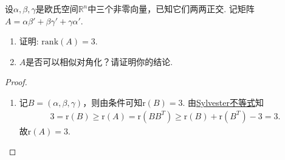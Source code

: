 \documentclass[../../main.tex]{subfiles}%
\begin{document}
\begin{example}
设$\alpha,\beta,\gamma$是欧氏空间$\mathbb{R}^n$中三个非零向量，已知它们两两正交. 记矩阵$A = \alpha\beta' + \beta\gamma' + \gamma\alpha'$.
\begin{enumerate}[(1)]
\item 证明: $\text{rank}(A) = 3$.

\item $A$是否可以相似对角化？请证明你的结论.
\end{enumerate}
\end{example}
\begin{proof}
\begin{enumerate}[(1)]
\item 记$B=(\alpha,\beta,\gamma)$，则由条件可知$\text{r}(B)=3$. 由\hyperref[proposition:Sylvester(西尔维斯特)不等式]{Sylvester不等式}知
\begin{align*}
3=\text{r}(B)\geqslant \text{r}(A)=\text{r}(BB^T)\geqslant \text{r}(B)+\text{r}(B^T)-3=3.
\end{align*}
故$\text{r}(A)=3.$


\end{enumerate}
\end{proof}
\end{document}

